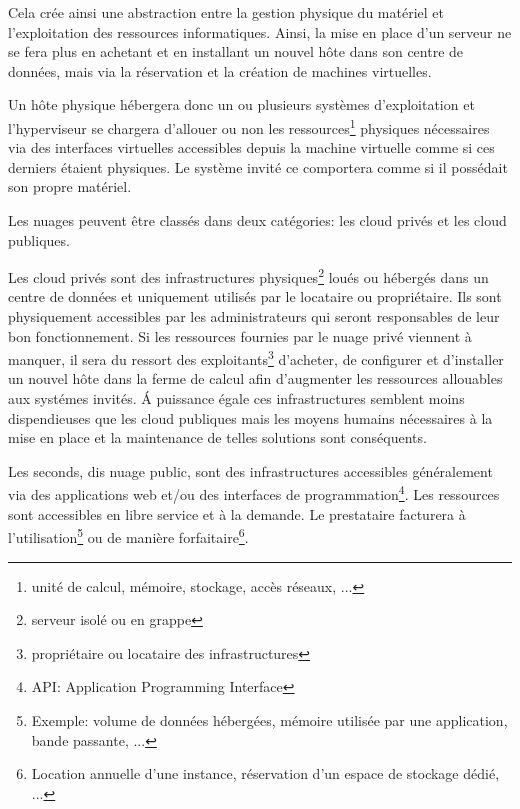 \documentclass[11pt, a4paper ]{report}
\begin{document}
Cela crée ainsi une abstraction entre la gestion physique du matériel et l'exploitation des ressources informatiques. Ainsi, la mise en place d'un serveur ne se fera plus en achetant et en installant un nouvel hôte dans son centre de données, mais via la réservation et la création de machines virtuelles.

Un hôte physique hébergera donc un ou plusieurs systèmes d'exploitation et l'hyperviseur se chargera d'allouer ou non les ressources\footnote{unité de calcul, mémoire, stockage, accès réseaux, ...}  physiques nécessaires via des interfaces virtuelles accessibles depuis la machine virtuelle comme si ces derniers étaient physiques. Le système invité ce comportera comme si il possédait son propre matériel.

Les nuages peuvent être classés dans deux catégories: les cloud privés et les cloud publiques.


Les cloud privés sont des infrastructures physiques\footnote{serveur isolé ou en grappe} loués ou hébergés dans un centre de données et uniquement utilisés par le locataire ou propriétaire. Ils sont physiquement accessibles par les administrateurs qui seront responsables de leur bon fonctionnement. Si les ressources fournies par le nuage privé viennent à manquer, il sera du ressort des exploitants\footnote{propriétaire ou locataire des infrastructures} d'acheter, de configurer et d'installer un nouvel hôte dans la ferme de calcul afin d'augmenter les ressources allouables aux systémes invités. Á puissance égale ces infrastructures semblent moins dispendieuses que les cloud publiques mais les moyens humains nécessaires à la mise en place et la maintenance de telles solutions sont conséquents.

Les seconds, dis nuage public, sont des infrastructures accessibles généralement via des applications web et/ou des interfaces de programmation\footnote{API: Application Programming Interface}. Les ressources sont accessibles en libre service et à la demande. Le prestataire facturera à l'utilisation\footnote{Exemple: volume de données hébergées, mémoire utilisée par une application, bande passante, ...} ou de manière forfaitaire\footnote{Location annuelle d'une instance, réservation d'un espace de stockage dédié, ...}.
\end{document}
